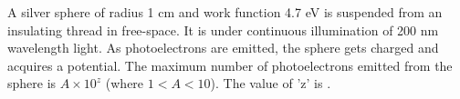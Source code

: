 
\item A silver sphere of radius 1 cm and work function 4.7 eV is suspended from an insulating thread in free-space. It is under continuous illumination of 200 nm wavelength light. As photoelectrons are emitted, the sphere gets charged and acquires a potential. The maximum number of photoelectrons emitted from the sphere is \( A \times 10^z \) (where \( 1 < A < 10 \)). The value of 'z' is \underline{\hspace{2.5cm}}.
